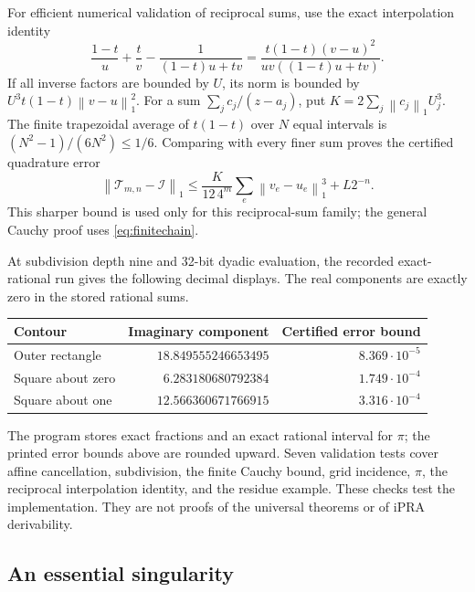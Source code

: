\documentclass[11pt]{article}
\theoremstyle{definition}
\newcommand{\norm}[1]{\left\lVert#1\right\rVert_1}
\newcommand{\trap}{\mathcal T}
\newcommand{\Int}{\mathcal I}
\begin{document}
For efficient numerical validation of reciprocal sums, use the exact
interpolation identity
\begin{equation}\label{eq:interpolationinverse}
 \frac{1-t}{u}+\frac t v-\frac1{(1-t)u+tv}
 =\frac{t(1-t)(v-u)^2}{uv((1-t)u+tv)}.
\end{equation}
If all inverse factors are bounded by \(U\), its norm is bounded by
\(U^3t(1-t)\norm{v-u}^2\).
For a sum \(\sum_jc_j/(z-a_j)\), put
\(K=2\sum_j\norm{c_j}U_j^3\). The finite trapezoidal average of
\(t(1-t)\) over \(N\) equal intervals is
\((N^2-1)/(6N^2)\le1/6\). Comparing with every finer sum proves the
certified quadrature error
\begin{equation}\label{eq:numericerror}
 \norm{\trap_{m,n}-\Int}
 \le\frac{K}{12\,4^m}\sum_e\norm{v_e-u_e}^{3}+L2^{-n}.
\end{equation}
This sharper bound is used only for this reciprocal-sum family; the
general Cauchy proof uses \eqref{eq:finitechain}.

At subdivision depth nine and 32-bit dyadic evaluation, the recorded
exact-rational run gives the following decimal displays. The real
components are exactly zero in the stored rational sums.
\begin{center}
\begin{tabular}{lrr}
\toprule
Contour & Imaginary component & Certified error bound\\\midrule
Outer rectangle & \(18.849555246653495\) & \(8.369\cdot10^{-5}\)\\
Square about zero & \(6.283180680792384\) & \(1.749\cdot10^{-4}\)\\
Square about one & \(12.566360671766915\) & \(3.316\cdot10^{-4}\)\\
\bottomrule
\end{tabular}
\end{center}
The program stores exact fractions and an exact rational interval for
\(\pi\); the printed error bounds above are rounded upward. Seven
validation tests cover affine cancellation, subdivision, the finite
Cauchy bound, grid incidence, \(\pi\), the reciprocal interpolation
identity, and the residue example. These checks test the implementation.
They are not proofs of the universal theorems or of iPRA derivability.

\subsection{An essential singularity}
\end{document}
